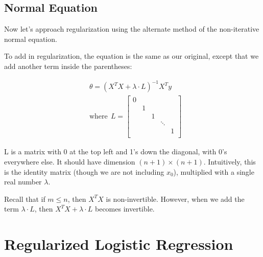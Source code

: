 \subsection{Normal Equation}
Now let's approach regularization using the alternate method of the non-iterative normal equation.

To add in regularization, the equation is the same as our original, except that we add another term inside the parentheses:

\begin{align*}
& \theta = \left( X^TX + \lambda \cdot L \right)^{-1} X^Ty \\
& \text{where}\ \ L = 
\begin{bmatrix} 
0 & & & & \\ 
& 1 & & & \\ 
& & 1 & & \\ 
& & & \ddots & \\
& & & & 1 \\
\end{bmatrix}
\end{align*}

L is a matrix with 0 at the top left and 1's down the diagonal, with 0's everywhere else. It should have dimension $(n+1)\times(n+1)$. Intuitively, this is the identity matrix (though we are not including $x_0$), multiplied with a single real number $\lambda$.

Recall that if $m \leq n$, then $X^TX$ is non-invertible. However, when we add the term $\lambda \cdot L$, then $X^TX + \lambda \cdot L$ becomes invertible.
 
 \section{Regularized Logistic Regression}
 